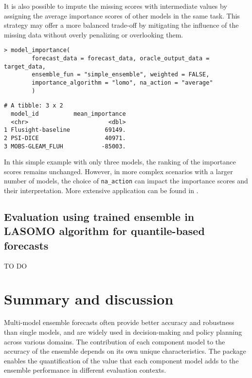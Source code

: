 \documentclass[
  article,
  shortnames,
  notitle]{jss}
\begin{document}
It is also possible to impute the missing scores with intermediate
values by assigning the average importance scores of other models in the
same task. This strategy may offer a more balanced trade-off by
mitigating the influence of the missing data without overly penalizing
or overlooking them.

\begin{verbatim}
> model_importance(
        forecast_data = forecast_data, oracle_output_data = target_data,
        ensemble_fun = "simple_ensemble", weighted = FALSE,
        importance_algorithm = "lomo", na_action = "average"
        )
\end{verbatim}

\small

\begin{verbatim}
# A tibble: 3 x 2
  model_id          mean_importance
  <chr>                       <dbl>
1 Flusight-baseline          69149.
2 PSI-DICE                   40971.
3 MOBS-GLEAM_FLUH           -85003.
\end{verbatim}

\normalsize

In this simple example with only three models, the ranking of the
importance scores remains unchanged. However, in more complex scenarios
with a larger number of models, the choice of \texttt{na\_action} can
impact the importance scores and their interpretation. More extensive
application can be found in \citet{kim2024}.

\subsection{Evaluation using trained ensemble in LASOMO algorithm for
quantile-based forecasts}\label{sec:trained-lomo-qntl}

TO DO

\section{Summary and discussion}\label{sec:discussion}

Multi-model ensemble forecasts often provide better accuracy and
robustness than single models, and are widely used in decision-making
and policy planning across various domains. The contribution of each
component model to the accuracy of the ensemble depends on its own
unique characteristics. The  package enables the
quantification of the value that each component model adds to the
ensemble performance in different evaluation contexts.
\end{document}
